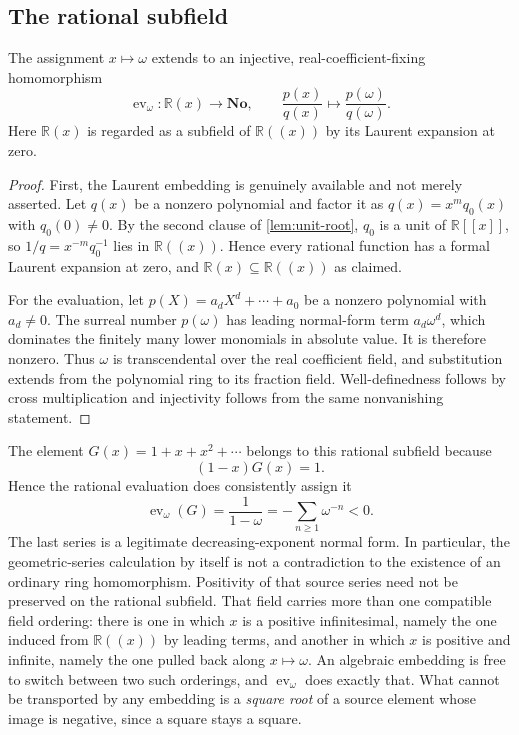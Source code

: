 \documentclass[11pt,letterpaper]{article}
\theoremstyle{definition}
\theoremstyle{remark}
\newenvironment{proposition}{\crefalias{theorem}{proposition}\propositionx}{\endpropositionx}
\newcommand{\No}{\mathbf{No}}
\newcommand{\R}{\mathbb R}
\newcommand{\ev}{\operatorname{ev}}
\begin{document}
\subsection{The rational subfield}
\begin{proposition}\label{prop:rational}
The assignment $x\mapsto\omega$ extends to an injective, real-coefficient-fixing
homomorphism
\[
 \ev_\omega:\R(x)\longrightarrow\No,
 \qquad \frac{p(x)}{q(x)}\longmapsto\frac{p(\omega)}{q(\omega)}.
\]
Here $\R(x)$ is regarded as a subfield of $\R((x))$ by its Laurent expansion
at zero.
\end{proposition}
\begin{proof}
First, the Laurent embedding is genuinely available and not merely asserted.
Let $q(x)$ be a nonzero polynomial and factor it as $q(x)=x^mq_0(x)$ with
$q_0(0)\ne0$. By the second clause of \cref{lem:unit-root}, $q_0$ is a unit of
$\R[[x]]$, so $1/q=x^{-m}q_0^{-1}$ lies in $\R((x))$. Hence every rational
function has a formal Laurent expansion at zero, and $\R(x)\subseteq\R((x))$
as claimed.

For the evaluation, let $p(X)=a_dX^d+\cdots+a_0$ be a nonzero polynomial with
$a_d\ne0$. The surreal number $p(\omega)$ has leading normal-form term
$a_d\omega^d$, which dominates the finitely many lower monomials in absolute
value. It is therefore nonzero. Thus $\omega$ is transcendental over the real
coefficient field, and substitution extends from the polynomial ring to its
fraction field. Well-definedness follows by cross multiplication and
injectivity follows from the same nonvanishing statement.
\end{proof}

The element $G(x)=1+x+x^2+\cdots$ belongs to this rational subfield because
\[
 (1-x)G(x)=1.
\]
Hence the rational evaluation does consistently assign it
\begin{equation}\label{eq:badgeom}
 \ev_\omega(G)=\frac{1}{1-\omega}
   =-\sum_{n\ge1}\omega^{-n}<0.
\end{equation}
The last series is a legitimate decreasing-exponent normal form.
In particular, the geometric-series calculation by itself is not a
contradiction to the existence of an ordinary ring homomorphism. Positivity
of that source series need not be preserved on the rational subfield. That
field carries more than one compatible field ordering: there is one in which
$x$ is a positive infinitesimal, namely the one induced from $\R((x))$ by
leading terms, and another in which $x$ is positive and infinite, namely the
one pulled back along $x\mapsto\omega$. An algebraic embedding is free to
switch between two such orderings, and $\ev_\omega$ does exactly that. What
cannot be transported by any embedding is a \emph{square root} of a source
element whose image is negative, since a square stays a square.
\end{document}
